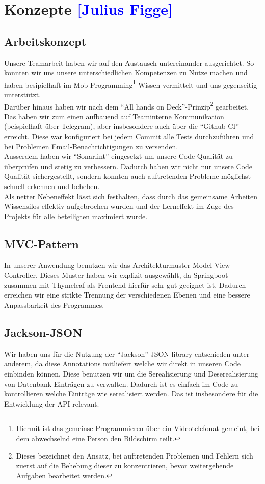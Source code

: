 

\section{Konzepte \textcolor{blue}{[Julius Figge]}}

\subsection{Arbeitskonzept}
Unsere Teamarbeit haben wir auf den Austausch untereinander ausgerichtet.
So konnten wir uns unsere unterschiedlichen Kompetenzen zu Nutze machen und haben besipielhaft im Mob-Programming\footnote{Hiermit ist das gemeinse Programmieren über ein Videotelefonat gemeint, bei dem abwechselnd eine Person den Bildschirm teilt.} Wissen vermittelt und uns gegenseitig unterstützt.\\
Darüber hinaus haben wir nach dem \enquote{All hands on Deck}-Prinzip\footnote{Dieses bezeichnet den Ansatz, bei auftretenden Problemen und Fehlern sich zuerst auf die Behebung dieser zu konzentrieren, bevor weitergehende Aufgaben bearbeitet werden.} gearbeitet.\\
Das haben wir zum einen aufbauend auf Teaminterne Kommunikation (beispielhaft über Telegram), aber insbesondere auch über die \enquote{Github CI} erreicht.
Diese war konfiguriert bei jedem Commit alle Tests durchzuführen und bei Problemen Email-Benachrichtigungen zu versenden.\\
Ausserdem haben wir \enquote{Sonarlint} eingesetzt um unsere Code-Qualität zu überprüfen und stetig zu verbessern.
Dadurch haben wir nicht nur unsere Code Qualität sichergestellt, sondern konnten auch auftretenden Probleme möglichst schnell erkennen und beheben.\\
Als netter Nebeneffekt lässt sich festhalten, dass durch das gemeinsame Arbeiten Wissensilos effektiv aufgebrochen wurden und der Lerneffekt im Zuge des Projekts für alle beteiligten maximiert wurde.

\subsection{MVC-Pattern}
In unserer Anwendung benutzen wir das Architekturmuster Model View Controller.
Dieses Muster haben wir explizit ausgewählt, da Springboot zusammen mit Thymeleaf als Frontend hierfür sehr gut geeignet ist. Dadurch erreichen wir eine strikte Trennung der verschiedenen Ebenen und eine bessere Anpassbarkeit des Programmes.

\subsection{Jackson-JSON}
Wir haben uns für die Nutzung der \enquote{Jackson}-JSON library entschieden unter anderem, da diese Annotations mitliefert welche wir direkt in unseren Code einbinden können. Diese benutzen wir um die Serealisierung und Deserealisierung von Datenbank-Einträgen zu verwalten. Dadurch ist es einfach im Code zu kontrollieren welche Einträge wie serealisiert werden. Das ist insbesondere für die Entwicklung der API relevant.